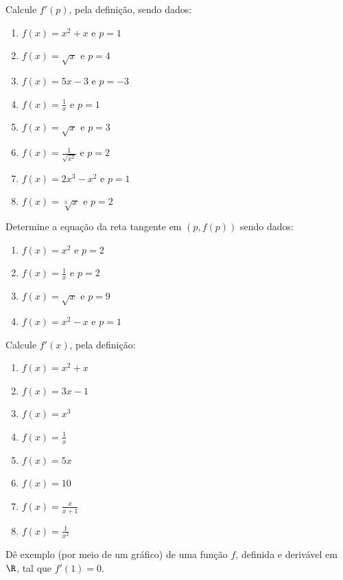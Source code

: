 \begin{exercicio}[4]
Calcule $f'(p)$, pela definição, sendo dados:
\begin{enumerate}[label=\alph*)]
    \item $f(x) = x^2 + x$ e $p = 1$
    \item $f(x) = \sqrt{x}$ e $p = 4$
    \item $f(x) = 5x - 3$ e $p = -3$
    \item $f(x) = \frac{1}{x}$ e $p = 1$
    \item $f(x) = \sqrt{x}$ e $p = 3$
    \item $f(x) = \frac{1}{\sqrt{x^2}}$ e $p = 2$
    \item $f(x) = 2x^3 - x^2$ e $p = 1$
    \item $f(x) = \sqrt[3]{x}$ e $p = 2$
\end{enumerate}
\end{exercicio}

\begin{exercicio}[5]
Determine a equação da reta tangente em $(p, f(p))$ sendo dados:
\begin{enumerate}[label=\alph*)]
    \item $f(x) = x^2$ e $p = 2$
    \item $f(x) = \frac{1}{x}$ e $p = 2$
    \item $f(x) = \sqrt{x}$ e $p = 9$
    \item $f(x) = x^2 - x$ e $p = 1$
\end{enumerate}
\end{exercicio}

\begin{exercicio}[6]
Calcule $f'(x)$, pela definição:
\begin{enumerate}[label=\alph*)]
    \item $f(x) = x^2 + x$
    \item $f(x) = 3x - 1$
    \item $f(x) = x^3$
    \item $f(x) = \frac{1}{x}$
    \item $f(x) = 5x$
    \item $f(x) = 10$
    \item $f(x) = \frac{x}{x + 1}$
    \item $f(x) = \frac{1}{x^2}$
\end{enumerate}
\end{exercicio}

\begin{exercicio}[7]
Dê exemplo (por meio de um gráfico) de uma função $f$, definida e derivável em $\R$, tal que $f'(1) = 0$.
\end{exercicio}

